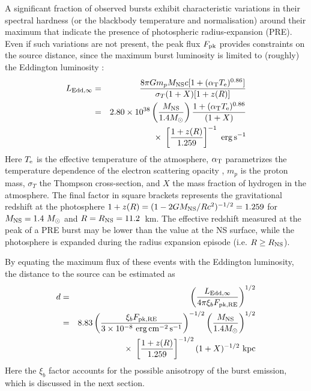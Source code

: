 \documentclass{aastex63}
\newcommand{\eps}{{\rm erg\,s^{-1}}}
\newcommand{\epcs}{{\rm erg\,cm^{-2}\,s^{-1}}}
\newcommand{\opz}{1.259}
\begin{document}
A significant fraction of observed bursts exhibit characteristic variations in their spectral hardness (or the blackbody temperature and normalisation) around their maximum that indicate the presence of photospheric radius-expansion (PRE). 
%
Even if such variations are not present, 
%
the peak flux $F_{\rm pk}$ provides constraints on the source distance, since the maximum burst luminosity is limited to (roughly) the Eddington luminosity \cite[e.g.][]{lew93}:
\begin{eqnarray}
  L_{\rm Edd,\infty} & = & \frac{8\pi G m_p M_{\rm NS} c
  [1+(\alpha_{\rm T}T_{\rm e})^{0.86}]} {\sigma_T(1+X)[1+z(R)]} %
       \nonumber \\
  & = & 2.80\times10^{38} \left(\frac{M_{\rm NS}}{1.4M_\odot}\right)
 \frac{1+(\alpha_{\rm T}T_{\rm e})^{0.86}}{(1+X)}
\nonumber \\ & & \times\  %
    \left[\frac{1+z(R)}{\opz}\right]^{-1}\ %
              \eps
  \label{ledd}
\end{eqnarray}
Here
$T_{\rm e}$ is the
effective temperature of the atmosphere, $\alpha_{\rm T}$ parametrizes the temperature dependence of the electron scattering
opacity \cite[$\simeq 2.2\times10^{-9}$~K$^{-1}$;][]{lew93},
$m_p$ is the proton mass, $\sigma_T$ the Thompson 
cross-section, and $X$ the
mass fraction of hydrogen in the atmosphere.
The final factor in
square brackets represents the gravitational redshift 
at the photosphere $1+z(R)=(1-2GM_{\rm NS}/R
c^2)^{-1/2}=1.259$ for $M_{\rm NS}=1.4\ M_\odot$ and $R=R_{\rm NS}=11.2$~km.
%
The effective redshift measured at the peak of a PRE burst may be lower than the value at the NS surface, while the photosphere is expanded during the radius expansion episode (i.e. $R\ge R_{\rm NS}$).


By equating the maximum flux of these events with the Eddington luminosity, the distance to the source can be estimated as
\begin{eqnarray}
 d & = & \left(\frac{L_{\rm Edd,\infty}}{4\pi \xi_b F_{\rm pk, RE}}\right)^{1/2} \nonumber \\
   & = & 8.83
	\left( \frac{\xi_b F_{\rm pk, RE}}{3\times10^{-8}\ \epcs} \right)^{-1/2}
       	\left(\frac{M_{\rm NS}}{1.4M_\odot}\right)^{1/2}
\nonumber \\ & & \times\  %
	\left[\frac{1+z(R)}{\opz}\right]^{-1/2}
	(1+X)^{-1/2}\ {\rm kpc}
 \label{disteq}
\end{eqnarray}
% 
Here the $\xi_b$ factor accounts for the possible anisotropy of the burst emission, 
which is discussed in the next section.
\end{document}
